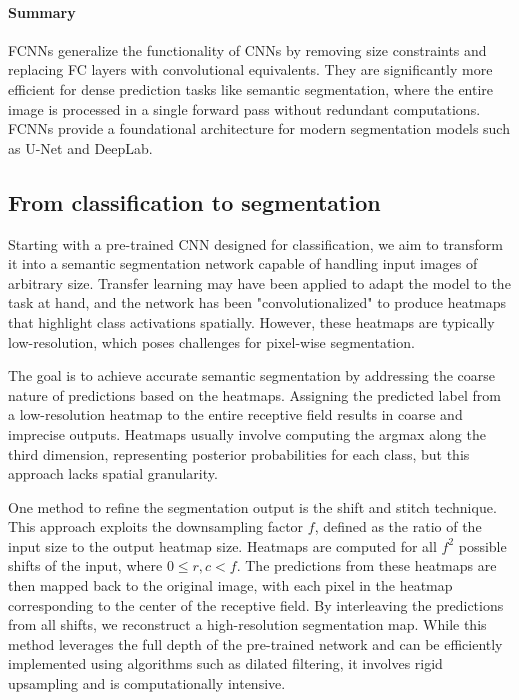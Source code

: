 \paragraph*{Summary}
FCNNs generalize the functionality of CNNs by removing size constraints and replacing FC layers with convolutional equivalents. 
They are significantly more efficient for dense prediction tasks like semantic segmentation, where the entire image is processed in a single forward pass without redundant computations. 
FCNNs provide a foundational architecture for modern segmentation models such as U-Net and DeepLab.

\subsection{From classification to segmentation}
Starting with a pre-trained CNN designed for classification, we aim to transform it into a semantic segmentation network capable of handling input images of arbitrary size. 
Transfer learning may have been applied to adapt the model to the task at hand, and the network has been "convolutionalized" to produce heatmaps that highlight class activations spatially. 
However, these heatmaps are typically low-resolution, which poses challenges for pixel-wise segmentation.

The goal is to achieve accurate semantic segmentation by addressing the coarse nature of predictions based on the heatmaps. 
Assigning the predicted label from a low-resolution heatmap to the entire receptive field results in coarse and imprecise outputs. 
Heatmaps usually involve computing the argmax along the third dimension, representing posterior probabilities for each class, but this approach lacks spatial granularity.

One method to refine the segmentation output is the shift and stitch technique. 
This approach exploits the downsampling factor $f$, defined as the ratio of the input size to the output heatmap size. 
Heatmaps are computed for all $f^2$ possible shifts of the input, where $0 \leq r, c < f$. 
The predictions from these heatmaps are then mapped back to the original image, with each pixel in the heatmap corresponding to the center of the receptive field. 
By interleaving the predictions from all shifts, we reconstruct a high-resolution segmentation map.
While this method leverages the full depth of the pre-trained network and can be efficiently implemented using algorithms such as dilated filtering, it involves rigid upsampling and is computationally intensive.


